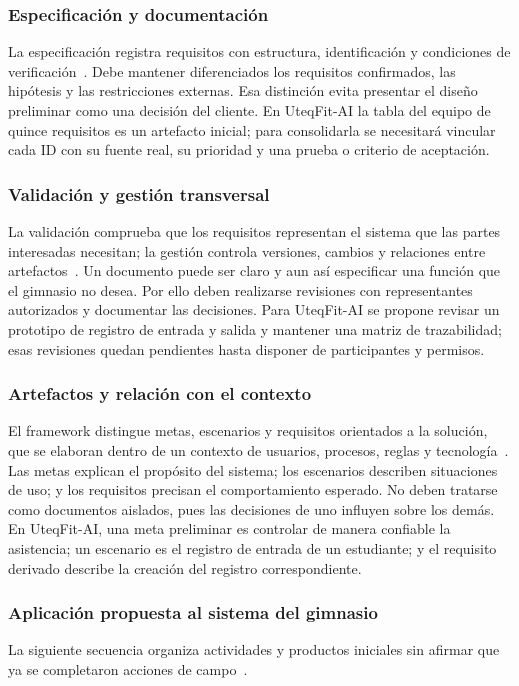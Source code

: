\subsubsection{Especificación y documentación}
La especificación registra requisitos con estructura, identificación y condiciones de verificación~\cite{ieee29148}. Debe mantener diferenciados los requisitos confirmados, las hipótesis y las restricciones externas. Esa distinción evita presentar el diseño preliminar como una decisión del cliente. En UteqFit-AI la tabla del equipo de quince requisitos es un artefacto inicial; para consolidarla se necesitará vincular cada ID con su fuente real, su prioridad y una prueba o criterio de aceptación.

\subsubsection{Validación y gestión transversal}
La validación comprueba que los requisitos representan el sistema que las partes interesadas necesitan; la gestión controla versiones, cambios y relaciones entre artefactos~\cite{ieee29148,pohl2025}. Un documento puede ser claro y aun así especificar una función que el gimnasio no desea. Por ello deben realizarse revisiones con representantes autorizados y documentar las decisiones. Para UteqFit-AI se propone revisar un prototipo de registro de entrada y salida y mantener una matriz de trazabilidad; esas revisiones quedan pendientes hasta disponer de participantes y permisos.

\subsubsection{Artefactos y relación con el contexto}
El framework distingue metas, escenarios y requisitos orientados a la solución, que se elaboran dentro de un contexto de usuarios, procesos, reglas y tecnología~\cite{pohl2025}. Las metas explican el propósito del sistema; los escenarios describen situaciones de uso; y los requisitos precisan el comportamiento esperado. No deben tratarse como documentos aislados, pues las decisiones de uno influyen sobre los demás. En UteqFit-AI, una meta preliminar es controlar de manera confiable la asistencia; un escenario es el registro de entrada de un estudiante; y el requisito derivado describe la creación del registro correspondiente.

\subsubsection{Aplicación propuesta al sistema del gimnasio}
La siguiente secuencia organiza actividades y productos iniciales sin afirmar que ya se completaron acciones de campo~\cite{ieee29148,pohl2025,swebok2024}.

